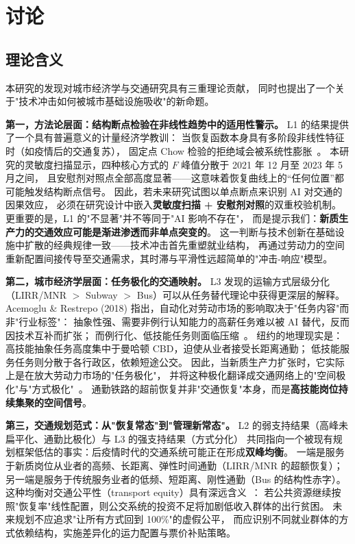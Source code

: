 \documentclass[runningheads]{llncs}
\begin{document}
\section{讨论}

\subsection{理论含义}

本研究的发现对城市经济学与交通研究具有三重理论贡献，
同时也提出了一个关于"技术冲击如何被城市基础设施吸收"的新命题。

\textbf{第一，方法论层面：结构断点检验在非线性趋势中的适用性警示。}
L1 的结果提供了一个具有普遍意义的计量经济学教训：
当恢复函数本身具有多阶段非线性特征时（如疫情后的交通复苏），
固定点 Chow 检验的拒绝域会被系统性膨胀~\cite{chow1960,bai2003}。
本研究的灵敏度扫描显示，四种核心方式的 $F$ 峰值分散于 2021 年 12 月至 2023 年 5 月之间，
且安慰剂对照点全部高度显著——这意味着恢复曲线上的``任何位置''都可能触发结构断点信号。
因此，若未来研究试图以单点断点来识别 AI 对交通的因果效应，
必须在研究设计中嵌入\textbf{灵敏度扫描 + 安慰剂对照}的双重校验机制。
更重要的是，L1 的"不显著"并不等同于"AI 影响不存在"，
而是提示我们：\textbf{新质生产力的交通效应可能是渐进渗透而非单点突变的}。
这一判断与技术创新在基础设施中扩散的经典规律一致——技术冲击首先重塑就业结构，
再通过劳动力的空间重新配置间接传导至交通需求，其时滞与平滑性远超简单的"冲击-响应"模型。

\textbf{第二，城市经济学层面：任务极化的交通映射。}
L3 发现的运输方式层级分化（LIRR/MNR $>$ Subway $>$ Bus）可以从任务替代理论中获得更深层的解释。
Acemoglu \& Restrepo (2018) 指出，自动化对劳动市场的影响取决于"任务内容"而非"行业标签"：
抽象性强、需要非例行认知能力的高薪任务难以被 AI 替代，反而因技术互补而扩张；
而例行化、低技能任务则面临压缩~\cite{acemoglu2018,acemoglu2020}。
纽约的地理现实是：高技能抽象任务高度集中于曼哈顿 CBD，迫使从业者接受长距离通勤；
低技能服务任务则分散于各行政区，依赖短途公交。
因此，当新质生产力扩张时，它实际上是在放大劳动力市场的"任务极化"，
并将这种极化翻译成交通网络上的"空间极化"与"方式极化"~\cite{glaeser2001}。
通勤铁路的超前恢复并非"交通恢复"本身，而是\textbf{高技能岗位持续集聚的空间信号}。

\textbf{第三，交通规划范式：从"恢复常态"到"管理新常态"。}
L2 的弱支持结果（高峰未扁平化、通勤比极化）与 L3 的强支持结果（方式分化）
共同指向一个被现有规划框架低估的事实：后疫情时代的交通系统可能正在形成\textbf{双峰均衡}。
一端是服务于新质岗位从业者的高频、长距离、弹性时间通勤（LIRR/MNR 的超额恢复）；
另一端是服务于传统服务业者的低频、短距离、刚性通勤（Bus 的结构性赤字）。
这种均衡对交通公平性（transport equity）具有深远含义~\cite{lucas2012}：
若公共资源继续按照"恢复率"线性配置，则公交系统的投资不足将加剧低收入群体的出行贫困。
未来规划不应追求"让所有方式回到 100\%"的虚假公平，
而应识别不同就业群体的方式依赖结构，实施差异化的运力配置与票价补贴策略。
\end{document}

